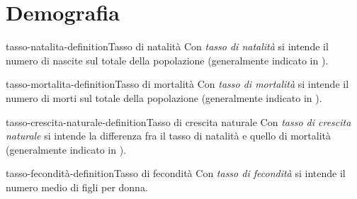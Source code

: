 \documentclass[preview]{standalone}
\begin{document}
\genpage



\section{Demografia}

\begin{snippetdefinition}{tasso-natalita-definition}{Tasso di natalità}
    Con \textit{tasso di natalità}
    si intende il numero di nascite sul totale della popolazione
    (generalmente indicato in \textperthousand).
\end{snippetdefinition}

\begin{snippetdefinition}{tasso-mortalita-definition}{Tasso di mortalità}
    Con \textit{tasso di mortalità}
    si intende il numero di morti sul totale della popolazione
    (generalmente indicato in \textperthousand).
\end{snippetdefinition}

\begin{snippetdefinition}{tasso-crescita-naturale-definition}{Tasso di crescita naturale}
    Con \textit{tasso di crescita naturale}
    si intende la differenza fra il tasso di natalità e quello di mortalità
    (generalmente indicato in \textperthousand).
\end{snippetdefinition}

\begin{snippetdefinition}{tasso-fecondità-definition}{Tasso di fecondità}
    Con \textit{tasso di fecondità}
    si intende il numero medio di figli per donna.
\end{snippetdefinition}
\end{document}
